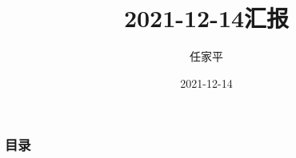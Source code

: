 \documentclass[12pt, utf-8]{beamer}
\title{2021-12-14汇报}
\author{任家平}
\institute{同济大学测绘与地理信息学院}
\date{2021-12-14}
\begin{document}
\begin{frame}
    \titlepage
\end{frame}

\begin{frame}
    \frametitle{目录}
    \tableofcontents
\end{frame}






%     

% 
\end{document}
